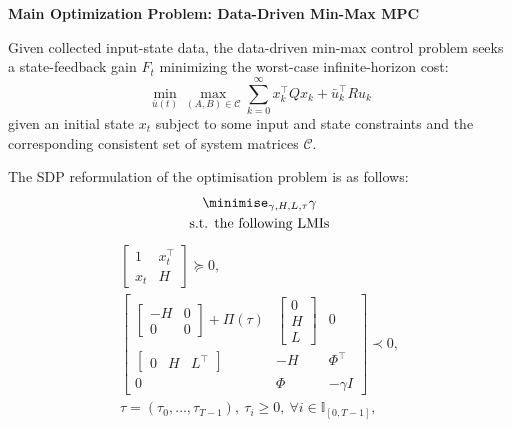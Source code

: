 \begin{framed}
	\noindent
	\textbf{Main Optimization Problem: Data-Driven Min-Max MPC}

	\vspace{0.3em}
	Given collected input-state data, the data-driven min-max control problem seeks a state-feedback gain \(F_t\) minimizing the worst-case infinite-horizon cost:
	\[
	\min_{\bar{u}(t)} \max_{(A, B) \in \mathcal{C}} \sum_{k=0}^{\infty} x_k^\top Q x_k + \bar{u}_k^\top R u_k
	\]
	given an initial state $x_t$ subject to some input and state constraints and the corresponding consistent set of system matrices \(\mathcal{C}\).

	The SDP reformulation of the optimisation problem is as follows:
	\begin{subequations}\nonumber %
		\begin{gather}
			\minimise_{\gamma, H, L, \tau} \gamma \\
			\text{s.t. the following LMIs}
		\end{gather}
	\end{subequations}
	\begin{subequations}\nonumber %
		\begin{gather}
			\begin{bmatrix}
				1 & x_t^\top \\
				x_t & H
			\end{bmatrix} \succeq 0,
			\\
			\begin{bmatrix}
				\begin{bmatrix}
					-H & 0 \\
					0 & 0
				\end{bmatrix}
				+
				\Pi(\tau)
				&
				\begin{bmatrix}
					0 \\
					H \\
					L
				\end{bmatrix}
				&
				0 \\
				\begin{bmatrix}
					0 & H & L^\top
				\end{bmatrix}
				& -H & \Phi^\top \\
				0 & \Phi & -\gamma I
			\end{bmatrix} \prec 0,
			\\
			\tau = (\tau_0, \ldots, \tau_{T-1}), \ \tau_i \geq 0, \ \forall i \in \mathbb{I}_{[0, T-1]},
		\end{gather}
	\end{subequations}

\end{framed}
